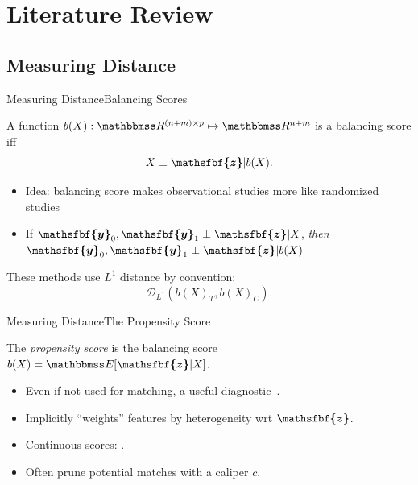 \documentclass[11pt, compress]{beamer}
\newcommand{\reals}{\ensuremath{\mathbbmss R}}
\renewcommand{\vec}[1]{\ensuremath{\boldsymbol{\mathsfbf{#1}}}}
\newcommand{\mat}[1]{\ensuremath{#1}}
\begin{document}
\section{Literature Review}

\subsection{Measuring Distance}
\begin{frame}{Measuring Distance}{Balancing Scores}
	\begin{definition}
		A function $b(\mat{X}): \reals^{(n + m) \times p} \mapsto \reals^{n + m}$ is a balancing score iff%
		\begin{equation}
			\mat{X} \perp \vec{z} | b(\mat{X}). \label{eqn:beamerdefbalance}%
		\end{equation}%
	\end{definition}%
	\begin{itemize}
		\item Idea: balancing score makes observational studies more like randomized studies
		\item If \( \vec{y}_0, \vec{y}_1 \perp \vec{z} | \mat{X} \), \emph{then} \( \vec{y}_0, \vec{y}_1 \perp \vec{z} | b(\mat{X}) \)
	\end{itemize}
	These methods use $L^1$ distance by convention:
	\begin{equation}
		\mathcal{D}_{L^1}(b(\mat{X})_T, b(\mat{X})_C). \label{eqn:beamerbalancingscoredistance}
	\end{equation}
\end{frame}

\begin{frame}{Measuring Distance}{The Propensity Score}
	\begin{definition}
		The \emph{propensity score} is the balancing score \( b(\mat{X}) = \mathbbmss E [\vec{z} | \mat{X}] \).
	\end{definition}%
	\begin{itemize}
		\item Even if not used for matching, a useful diagnostic~\parencite{dehejia_causal_1999}.
		\item Implicitly ``weights'' features by heterogeneity wrt $\vec{z}$.
		\item Continuous scores: \textcite{imai_causal_2004}.
		\item Often prune potential matches with a caliper $c$.
	\end{itemize}
\end{frame}
\end{document}
